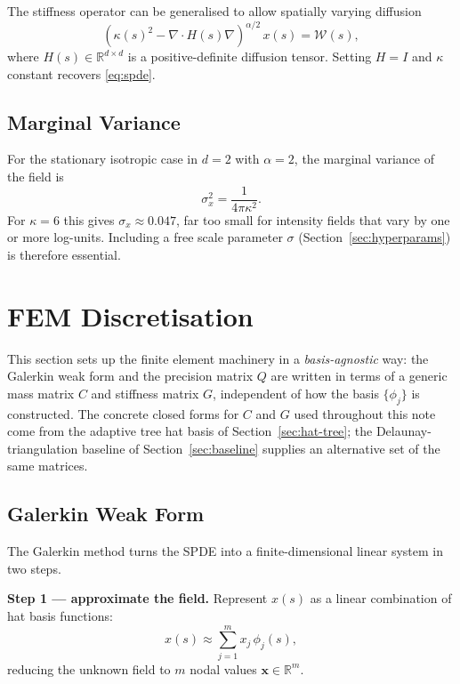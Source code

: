 \documentclass[11pt]{article}
\newcommand{\R}{\mathbb{R}}
\begin{document}
The stiffness operator can be generalised to allow spatially varying diffusion
\begin{equation}
  (\kappa(s)^2 - \nabla \cdot H(s) \nabla)^{\alpha/2} \, x(s) = \mathcal{W}(s),
  \label{eq:spde-gen}
\end{equation}
where $H(s) \in \R^{d\times d}$ is a positive-definite diffusion tensor.
Setting $H = I$ and $\kappa$ constant recovers \eqref{eq:spde}.

\subsection{Marginal Variance}

For the stationary isotropic case in $d=2$ with $\alpha=2$, the marginal
variance of the field is
\begin{equation}
  \sigma_x^2 = \frac{1}{4\pi\kappa^2}.
  \label{eq:margvar}
\end{equation}
For $\kappa = 6$ this gives $\sigma_x \approx 0.047$, far too small for
intensity fields that vary by one or more log-units.  Including a free scale
parameter $\sigma$ (Section~\ref{sec:hyperparams}) is therefore essential.

\section{FEM Discretisation}

This section sets up the finite element machinery in a \emph{basis-agnostic}
way: the Galerkin weak form and the precision matrix $Q$ are written in terms of
a generic mass matrix $C$ and stiffness matrix $G$, independent of how the basis
$\{\phi_j\}$ is constructed.  The concrete closed forms for $C$ and $G$ used
throughout this note come from the adaptive tree hat basis of
Section~\ref{sec:hat-tree}; the Delaunay-triangulation baseline of
Section~\ref{sec:baseline} supplies an alternative set of the same matrices.

\subsection{Galerkin Weak Form}
\label{sec:galerkin}

The Galerkin method turns the SPDE into a finite-dimensional linear system
in two steps.

\textbf{Step 1 --- approximate the field.}  Represent $x(s)$ as a linear
combination of hat basis functions:
\begin{equation}
  x(s) \approx \sum_{j=1}^m x_j\,\phi_j(s),
  \label{eq:fem-approx}
\end{equation}
reducing the unknown field to $m$ nodal values $\mathbf{x}\in\R^m$.
\end{document}
